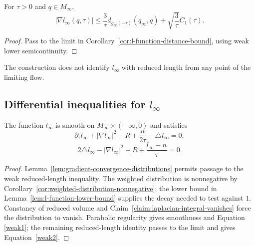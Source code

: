 \begin{corollary}\label{cor:l-infinity-gradient-bound}
\label{linfest}

For $\tau>0$ and $q\in M_\infty$,
\[
 |\nabla l_\infty(q,\tau)|\leq
 \frac3\tau d_{g_\infty(-\tau)}(q_\infty,q)
 +\sqrt{\frac3\tau}C_1(\tau).
\]
\end{corollary}
\begin{proof}
\sketch Pass to the limit in
Corollary~\ref{cor:l-function-distance-bound}, using weak lower
semicontinuity.
\end{proof}

\begin{remark}\label{rem:l-infinity-not-reduced-length}
The construction does not identify $l_\infty$ with reduced length
from any point of the limiting flow.
\end{remark}

\subsection{Differential inequalities for $l_\infty$}

\begin{proposition}\label{prop:l-infinity-differential-equations}
\label{weakeqn}

The function $l_\infty$ is smooth on
$M_\infty\times(-\infty,0)$ and satisfies
\begin{equation}\label{weak1}
 \partial_\tau l_\infty+|\nabla l_\infty|^2-R
 +\frac n{2\tau}-\triangle l_\infty=0,
\end{equation}
\begin{equation}\label{weak2}
 2\triangle l_\infty-|\nabla l_\infty|^2+R
 +\frac{l_\infty-n}{\tau}=0.
\end{equation}
\end{proposition}
\begin{proof}
\sketch Lemma~\ref{lem:gradient-convergence-distributions} permits
passage to the weak reduced-length inequality. The weighted
distribution is nonnegative by
Corollary~\ref{cor:weighted-distribution-nonnegative}; the lower
bound in Lemma~\ref{lem:l-function-lower-bound} supplies the decay
needed to test against $1$. Constancy of reduced volume and
Claim~\ref{claim:laplacian-integral-vanishes} force the distribution
to vanish. Parabolic regularity gives smoothness and Equation
\ref{weak1}; the remaining reduced-length identity passes to the
limit and gives Equation~\ref{weak2}.
\end{proof}


